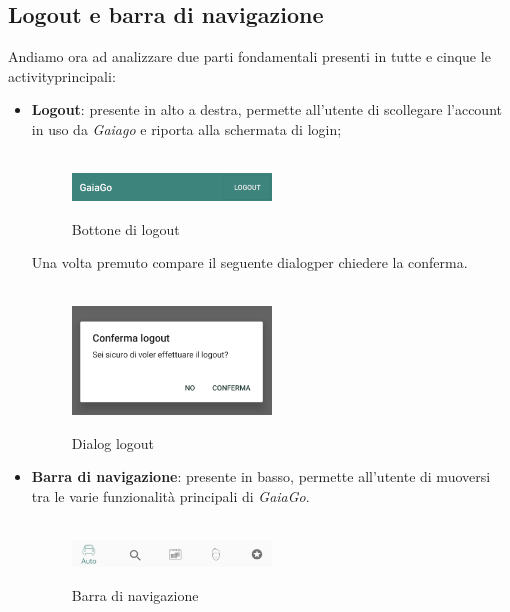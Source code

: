 \subsection{Logout e barra di navigazione}
Andiamo ora ad analizzare due parti fondamentali presenti in tutte e cinque le activity\glosp principali:
\begin{itemize}
	\item \textbf{Logout}: presente in alto a destra, permette all'utente di scollegare l'account in uso da \textit{Gaiago} e riporta alla schermata di login;
	\\\\
	  \begin{figure}[H] 
	 	\centering 
	 	\includegraphics[width=0.5\textwidth]{res/images/logout.png}\\
	 	\caption{Bottone di logout}
	 	\label{Login button}
	 \end{figure}
 Una volta premuto compare il seguente dialog\glosp per chiedere la conferma.
 \\\\
 \begin{figure}[H] 
 	\centering 
 	\includegraphics[width=0.5\textwidth]{res/images/logout_press.png}\\
 	\caption{Dialog logout}
 	\label{Logout_press}
 \end{figure}
 	\item  \textbf{Barra di navigazione}: presente in basso, permette all'utente di muoversi tra le varie funzionalità principali di \textit{GaiaGo}.
 	\\\\
 	  \begin{figure}[H] 
 	  	\centering 
 	  	\includegraphics[width=0.5\textwidth]{res/images/barra_navigazione.png}\\
 	  	\caption{Barra di navigazione}
 	  	\label{Barra di navigazione}
 	  \end{figure}
\end{itemize}
\pagebreak

